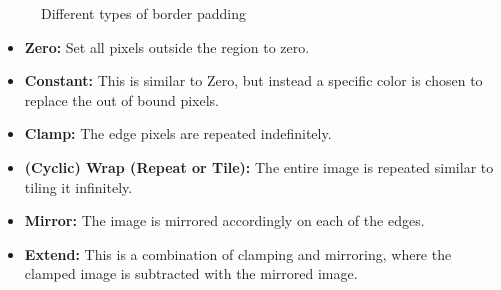 \documentclass[twoside,a4paper,article]{combine}
\begin{document}
\begin{minipage}{\textwidth}\begin{figure}[H]
    \centering
    \caption{Different types of border padding}
    \label{fig:padding_borders}
\end{figure}\end{minipage}
\begin{itemize}
    \item \textbf{Zero:} Set all pixels outside the region to zero.
    \item \textbf{Constant:} This is similar to Zero, but instead a specific color is chosen to replace the out of bound pixels.
    \item \textbf{Clamp:} The edge pixels are repeated indefinitely.
    \item \textbf{(Cyclic) Wrap (Repeat or Tile):} The entire image is repeated similar to tiling it infinitely.
    \item \textbf{Mirror:} The image is mirrored accordingly on each of the edges.
    \item \textbf{Extend:} This is a combination of clamping and mirroring, where the clamped image is subtracted with the mirrored image.
\end{itemize}\label{chap:padding}
\end{document}
